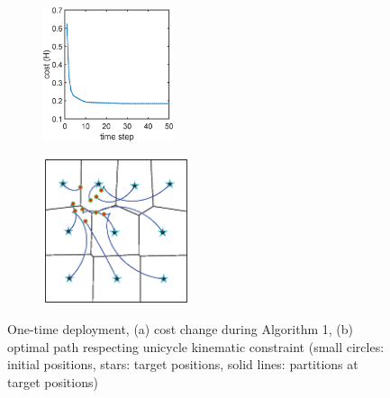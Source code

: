 \documentclass[journal]{IEEEtran}
\begin{document}
\begin{figure}
	\centering
	 \begin{subfigure}[b]{0.22\textwidth}
	\centering
	\includegraphics[width=1.5in]{figure/init_10_deploy_cmd2}
	\caption{}
	\end{subfigure}	
	 \begin{subfigure}[b]{0.22\textwidth}
	\centering
	\includegraphics[width=1.69in]{figure/init_10_deploy_cmd1}
	\caption{}
\end{subfigure}	
	\caption{One-time deployment, (a) cost change during Algorithm 1, (b) optimal path respecting unicycle kinematic constraint (small circles: initial positions, stars: target positions, solid lines: partitions at target positions)}
	\label{fig:fig2}
\end{figure}
\end{document}
